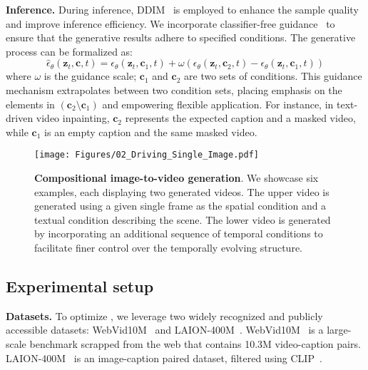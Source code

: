 \textbf{Inference.} 
During inference, DDIM~\cite{zhang2022gddim} is employed to enhance the sample quality and improve inference efficiency.
We incorporate classifier-free guidance~\cite{ho2022classifier} to ensure that the generative results adhere to specified conditions.
The generative process can be formalized as:
\begin{equation}
    \hat{\epsilon}_{\theta}(\bm{z}_{t}, \bm{c}, t) = \epsilon_{\theta}(\bm{z}_{t}, \bm{c}_{1}, t) + \omega \left(\epsilon_{\theta}(\bm{z}_{t}, \bm{c}_{2}, t) - \epsilon_{\theta}(\bm{z}_{t}, \bm{c}_{1}, t)\right)
\end{equation}
where $\omega$ is the guidance scale; $\bm{c}_{1}$ and $\bm{c}_{2}$ are two sets of conditions.
This guidance mechanism extrapolates between two condition sets, placing emphasis on the elements in $(\bm{c}_{2} \setminus \bm{c}_{1})$ and empowering flexible application.
For instance, in text-driven video inpainting, $\bm{c}_{2}$ represents the expected caption and a masked video, while $\bm{c}_{1}$ is an empty caption and the same masked video.

\begin{figure}[t]
    \centering
    \texttt{[image: Figures/02\_Driving\_Single\_Image.pdf]}
     \vspace{-1.5em}
    \caption{
    \small
    \textbf{Compositional image-to-video generation}.
    We showcase six examples, each displaying two generated videos.
    The upper video is generated using a given single frame as the spatial condition and a textual condition describing the scene.
    The lower video is generated by incorporating an additional sequence of temporal conditions to facilitate finer control over the temporally evolving structure.
    }
    \label{fig:local_image}
    \vspace{-4mm}
\end{figure}

\subsection{Experimental setup}
\textbf{Datasets.} 
To optimize \method, we leverage two widely recognized and publicly accessible datasets: WebVid10M~\cite{2021Frozen} and LAION-400M~\cite{schuhmann2021laion}.
WebVid10M~\cite{2021Frozen} is a large-scale benchmark scrapped from the web that contains 10.3M video-caption pairs.
LAION-400M~\cite{schuhmann2021laion} is an image-caption paired dataset, filtered using CLIP~\cite{radford2021CLIP}.

